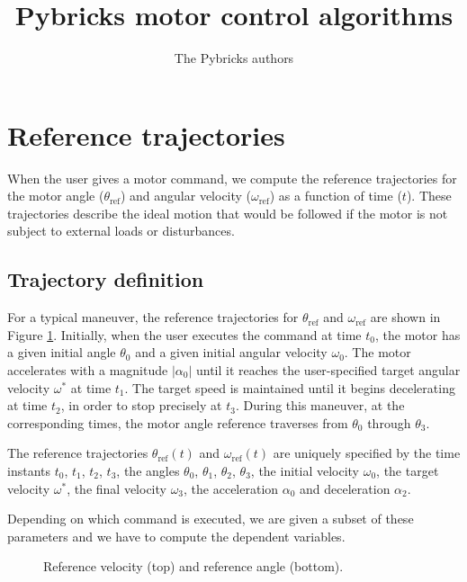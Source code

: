 \documentclass[12pt, a4paper]
{article}
\title{Pybricks motor control algorithms}
\author{The Pybricks authors}
\providecommand{\sub}[1]{_{\text{#1}}}
\providecommand{\w}{\omega}
\providecommand{\wt}{\w^*}
\providecommand{\wref}{\w\sub{ref}}
\renewcommand{\th}{\theta}
\providecommand{\thref}{\th\sub{ref}}
\renewcommand{\a}{\alpha}
\providecommand{\abs}[1]{\left|#1\right|}
\begin{document}
\maketitle

\tableofcontents
\pagebreak
\section{Reference trajectories}

When the user gives a motor command, we compute the reference trajectories for
the motor angle ($\thref$) and angular velocity ($\wref$) as a function of
time ($t$). These trajectories describe the ideal motion that would be followed
if the motor is not subject to external loads or disturbances.

\subsection{Trajectory definition}

For a typical maneuver, the reference trajectories for $\thref$ and $\wref$
are shown in Figure \ref{fig:plots}. Initially, when the user executes the
command at time $t_0$, the motor has a given initial angle $\th_0$ and a given
initial angular velocity $\w_0$. The motor accelerates with a magnitude
$\abs{\a_0}$ until it reaches the user-specified target angular velocity $\wt$
at time $t_1$. The target speed is maintained until it begins decelerating at
time $t_2$, in order to stop precisely at $t_3$. During this maneuver, at the
corresponding times, the motor angle reference traverses from $\th_0$ through
$\th_3$.

The reference trajectories $\thref(t)$ and $\wref(t)$ are uniquely specified by
the time instants $t_0$, $t_1$, $t_2$, $t_3$, the angles $\th_0$, $\th_1$,
$\th_2$, $\th_3$, the initial velocity $\w_0$, the target velocity $\wt$, the
final velocity $\w_3$, the acceleration $\a_0$ and deceleration $\a_2$.

Depending on which command is executed, we are given a subset of these
parameters and we have to compute the dependent variables.


\begin{figure}[H]
    \centering
    
    \caption{
        Reference velocity (top) and reference angle (bottom).
        \label{fig:plots}}
\end{figure}
\end{document}
